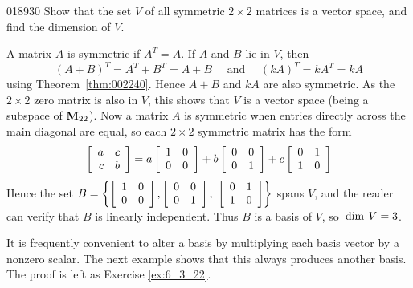 \begin{example}{}{018930}
Show that the set $V$ of all symmetric $2 \times 2$ matrices is a vector space, and find the dimension of $V$.

\begin{solution}
A matrix $A$ is symmetric if $A^{T} = A$. If $A$ and $B$ lie in $V$, then
\begin{equation*}
(A + B)^T = A^T + B^T = A + B \quad \mbox{ and } \quad (kA)^T = kA^T = kA
\end{equation*}
using Theorem~\ref{thm:002240}. Hence $A + B$ and $kA$ are also symmetric. As the $2 \times 2$ zero matrix is also in $V$, this shows that $V$ is a vector space (being a subspace of $\textbf{M}_{22}$). Now a matrix $A$ is symmetric when entries directly across the main diagonal are equal, so each $2 \times 2$ symmetric matrix has the form
\begin{equation*}
\left[ \begin{array}{rr}
a & c \\
c & b
\end{array} \right]
= a
\left[ \begin{array}{rr}
1 & 0 \\
0 & 0
\end{array} \right]
+ b
\left[ \begin{array}{rr}
0 & 0 \\
0 & 1
\end{array} \right]
+ c
\left[ \begin{array}{rr}
0 & 1 \\
1 & 0
\end{array} \right]
\end{equation*}
Hence the set 
$B = \left\{
\left[ \begin{array}{rr}
1 & 0 \\
0 & 0
\end{array} \right]
, 
\left[ \begin{array}{rr}
0 & 0 \\
0 & 1
\end{array} \right]
,\
\left[ \begin{array}{rr}
0 & 1 \\
1 & 0
\end{array} \right]
\right\}$
 spans $V$, and the reader can verify that $B$ is linearly independent. Thus $B$ is a basis of $V$, so $\thinspace\operatorname{dim\medspace} V = 3$.
\end{solution}
\end{example}

It is frequently convenient to alter a basis by multiplying each basis vector by a nonzero scalar. The next example shows that this always produces another basis. The proof is left as Exercise \ref{ex:6_3_22}.

